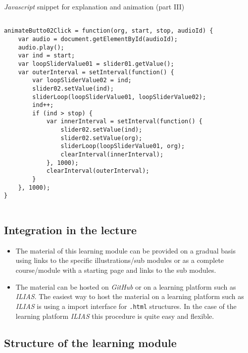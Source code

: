 \documentclass{article}
\begin{document}
\begin{CodeSnippet}[!hp]
	\centering
	\caption{\emph{Javascript} snippet for explanation and animation (part III)}
	\vspace{0.25cm}	
	\begin{BVerbatim}
		
animateButto02Click = function(org, start, stop, audioId) {    
	var audio = document.getElementById(audioId);
	audio.play();
	var ind = start;
	var loopSliderValue01 = slider01.getValue();
	var outerInterval = setInterval(function() {
		var loopSliderValue02 = ind;
		slider02.setValue(ind);
		sliderLoop(loopSliderValue01, loopSliderValue02);
		ind++;
		if (ind > stop) {
			var innerInterval = setInterval(function() {
				slider02.setValue(ind);
				slider02.setValue(org);            
				sliderLoop(loopSliderValue01, org);
				clearInterval(innerInterval);
			}, 1000);        
			clearInterval(outerInterval);
		}
	}, 1000);
}
		
	\end{BVerbatim}
	\vspace*{-2mm}
	\label{JsCodSniAn03}
\end{CodeSnippet}

\subsection{Integration in the lecture}

\begin{itemize}
	\item The material of this learning module can be provided on a gradual basis using links to the specific illustrations/sub modules or as a complete course/module with a starting page and links to the sub modules.
	\item The material can be hosted on \emph{GitHub} or on a learning platform such as \emph{ILIAS}. The easiest way to host the material on a learning platform such as \emph{ILIAS} is using a import interface for \texttt{.html} structures. In the case of the learning platform \emph{ILIAS} this procedure is quite easy and flexible.	
\end{itemize}

\subsection{Structure of the learning module}
\end{document}
